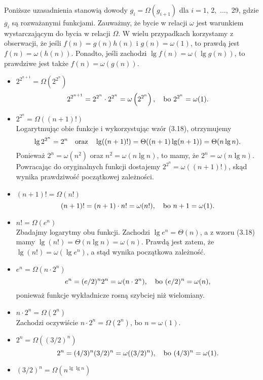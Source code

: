 \subsubsection{} %
Poniższe uzasadnienia stanowią dowody $g_i=\Omega(g_{i+1})$ dla $i=1$, 2,~$\dots$,~29, gdzie $g_i$ są rozważanymi funkcjami. Zauważmy, że bycie w relacji $\omega$ jest warunkiem wystarczającym do bycia w relacji $\Omega$. W wielu przypadkach korzystamy z obserwacji, że jeśli $f(n)=g(n)h(n)$ i $g(n)=\omega(1)$, to prawdą jest $f(n)=\omega(h(n))$. Ponadto, jeśli zachodzi $\lg f(n)=\omega(\lg g(n))$, to prawdziwe jest także $f(n)=\omega(g(n))$.
\begin{itemize}
\item $2^{2^{n+1}}=\Omega\left(2^{2^n}\right)$ \\
	\[
		2^{2^{n+1}} = 2^{2^n}\cdot2^{2^n} = \omega\left(2^{2^n}\right), \quad\hbox{bo }2^{2^n} = \omega(1).
	\]
\item $2^{2^n}=\Omega((n+1)!)$ \\
	Logarytmując obie funkcje i wykorzystując wzór (3.18), otrzymujemy
	\[
		\lg 2^{2^n} = 2^n \quad\hbox{oraz}\quad \lg((n+1)!) = \Theta((n+1)\lg(n+1)) = \Theta(n\lg n).
	\]
	Ponieważ $2^n=\omega(n^2)$ oraz $n^2=\omega(n\lg n)$, to mamy, że $2^n=\omega(n\lg n)$. Powracając do oryginalnych funkcji dostajemy $2^{2^n}=\omega((n+1)!)$, skąd wynika prawdziwość początkowej zależności.
\item $(n+1)!=\Omega(n!)$
	\[
		(n+1)! = (n+1)\cdot n! = \omega(n!), \quad\hbox{bo }n+1 = \omega(1).
	\]
\item $n!=\Omega(e^n)$ \\
	Zbadajmy logarytmy obu funkcji. Zachodzi $\lg e^n=\Theta(n)$, a z wzoru (3.18) mamy $\lg(n!)=\Theta(n\lg n)=\omega(n)$. Prawdą jest zatem, że $\lg(n!)=\omega(\lg e^n)$, a stąd wynika początkowa zależność.
\item $e^n=\Omega(n\cdot2^n)$ \\
	\[
		e^n = (e/2)^n2^n = \omega(n\cdot2^n), \quad\hbox{bo }(e/2)^n = \omega(n),
	\]
	ponieważ funkcje wykładnicze rosną szybciej niż wielomiany.
\item $n\cdot2^n=\Omega(2^n)$ \\
	Zachodzi oczywiście $n\cdot2^n = \Omega(2^n)$, bo $n = \omega(1)$.
\item $2^n=\Omega((3/2)^n)$ \\
	\[
		2^n = (4/3)^n(3/2)^n = \omega((3/2)^n), \quad\hbox{bo }(4/3)^n = \omega(1).
	\]
\item $(3/2)^n=\Omega\left(n^{\lg\lg n}\right)$ \\

\end{itemize}
